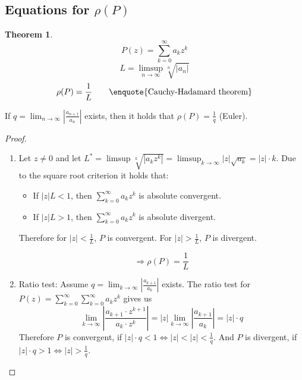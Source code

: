 \documentclass[a4paper,landscape,twocolumn]{article}
\theoremstyle{definition}
\newtheorem{theorem}{Theorem}
\newcommand\abs[1]{\left|#1\right|}
\begin{document}
\subsection{Equations for $\rho(P)$}
%
\begin{theorem}
  \[ P(z) = \sum_{k=0}^\infty a_k z^k \]
  \[ L = \limsup_{n\to\infty} \sqrt[n]{\abs{a_n}} \]
  \[ \rho(P) = \frac{1}{L} \qquad \text{\enquote{Cauchy-Hadamard theorem}} \]

  If $q = \lim_{n\to\infty} \abs{\frac{a_{n+1}}{a_n}}$ exists,
  then it holds that $\rho(P) = \frac1q$ (Euler).

\end{theorem}
\begin{proof}
  \begin{enumerate}
    \item
      Let $z \neq 0$ and let $L^* = \limsup{\sqrt[k]{\abs{a_k z^k}}} = \limsup_{k\to\infty}{\abs{z}\sqrt{a_k}} = \abs{z} \cdot k$.
      Due to the square root criterion it holds that:
      \begin{itemize}
        \item If $\abs{z} L < 1$, then $\sum_{k=0}^\infty a_k z^k$ is absolute convergent.
        \item If $\abs{z} L > 1$, then $\sum_{k=0}^\infty a_k z^k$ is absolute divergent.
      \end{itemize}

      Therefore for $\abs{z} < \frac1{L}$, $P$ is convergent.
      For $\abs{z} > \frac{1}{L}$, $P$ is divergent.

      \[ \Rightarrow \rho(P) = \frac{1}{L} \]
    \item Ratio test: Assume $q = \lim_{k\to\infty} \abs{\frac{a_{k+1}}{a_k}}$ exists.
      The ratio test for $P(z) = \sum_{k=0}^\infty \sum_{k=0}^\infty a_k z^k$ gives us
      \[
        \lim_{k\to\infty} \abs{\frac{a_{k+1} \cdot z^{k+1}}{a_k \cdot z^k}}
        = \abs{z} \lim_{k\to\infty} \abs{\frac{a_{k+1}}{a_k}}
        = \abs{z} \cdot q
      \]
      Therefore $P$ is convergent, if $\abs{z} \cdot q < 1 \Leftrightarrow \abs{z} < \abs{z} < \frac1{q}$.
      And $P$ is divergent, if $\abs{z} \cdot q > 1 \Leftrightarrow \abs{z} > \frac1{q}$.
  \end{enumerate}
\end{proof}
\end{document}
